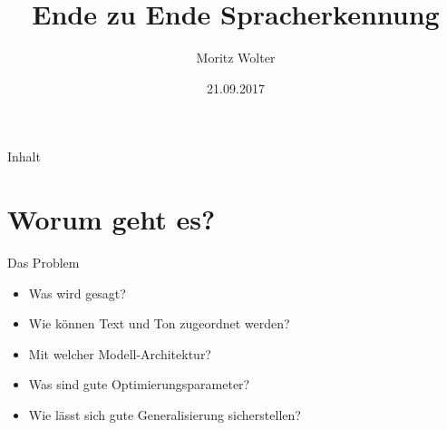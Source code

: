 \documentclass[10pt]{beamer}
\title{Ende zu Ende Spracherkennung}
\author{Moritz Wolter}
\date{21.09.2017}
\begin{document}
\begin{frame}
  \titlepage
\end{frame}

\begin{frame}{Inhalt}
  \tableofcontents
\end{frame}

\section{Worum geht es?}
\begin{frame}{Das Problem}
	\begin{itemize}
		\item Was wird gesagt?
		\item Wie können Text und Ton zugeordnet werden?
		\item Mit welcher Modell-Architektur?
		\item Was sind gute Optimierungsparameter?
		\item Wie lässt sich gute Generalisierung sicherstellen?
	\end{itemize}
\end{frame}
\end{document}

